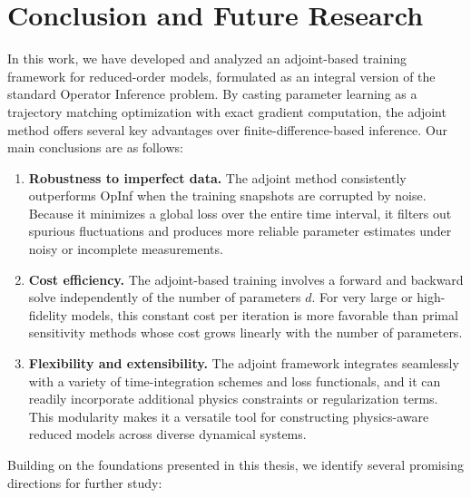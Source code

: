 
\chapter{Conclusion and Future Research}
\label{chap:conclusion}

In this work, we have developed and analyzed an adjoint-based training framework for reduced-order models, formulated as an integral version of the standard Operator Inference problem.  By casting parameter learning as a trajectory matching optimization with exact gradient computation, the adjoint method offers several key advantages over finite-difference-based inference.  Our main conclusions are as follows:

\begin{enumerate}[label=(\roman*)]
  \item \textbf{Robustness to imperfect data.}  
    The adjoint method consistently outperforms OpInf when the training snapshots are corrupted by noise. Because it minimizes a global loss over the entire time interval, it filters out spurious fluctuations and produces more reliable parameter estimates under noisy or incomplete measurements.

  \item \textbf{Cost efficiency.}  
    The adjoint-based training involves a forward and backward solve independently of the number of parameters $d$. For very large or high-fidelity models, this constant cost per iteration is more favorable than primal sensitivity methods whose cost grows linearly with the number of parameters.

  \item \textbf{Flexibility and extensibility.}  
    The adjoint framework integrates seamlessly with a variety of time-integration schemes and loss functionals, and it can readily incorporate additional physics constraints or regularization terms. This modularity makes it a versatile tool for constructing physics-aware reduced models across diverse dynamical systems.
\end{enumerate}

Building on the foundations presented in this thesis, we identify several promising directions for further study:

